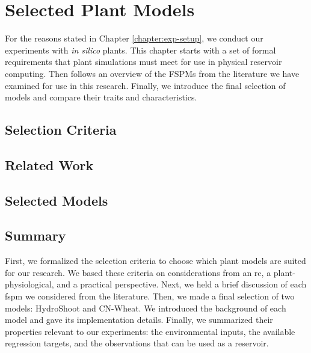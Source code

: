 
\chapter{Selected Plant Models} \label{chapter:models-used}

For the reasons stated in Chapter \ref{chapter:exp-setup}, we conduct our experiments with \textit{in silico} plants.
This chapter starts with a set of formal requirements that plant simulations must meet for use in physical reservoir computing.
Then follows an overview of the FSPMs from the literature we have examined for use in this research.
Finally, we introduce the final selection of models and compare their traits and characteristics.


\section{Selection Criteria} \label{sec:model-selection-criteria}



\section{Related Work} \label{sec:models-considered}



\section{Selected Models} \label{sec:selected-models}


\section{Summary}

First, we formalized the selection criteria to choose which plant models are suited for our research.
We based these criteria on considerations from an \acrshort{rc}, a plant-physiological, and a practical perspective.
Next, we held a brief discussion of each \acrshort{fspm} we considered from the literature.
Then, we made a final selection of two models: HydroShoot and CN-Wheat.
We introduced the background of each model and gave its implementation details.
Finally, we summarized their properties relevant to our experiments: the environmental inputs, the available regression targets, and the observations that can be used as a reservoir.




